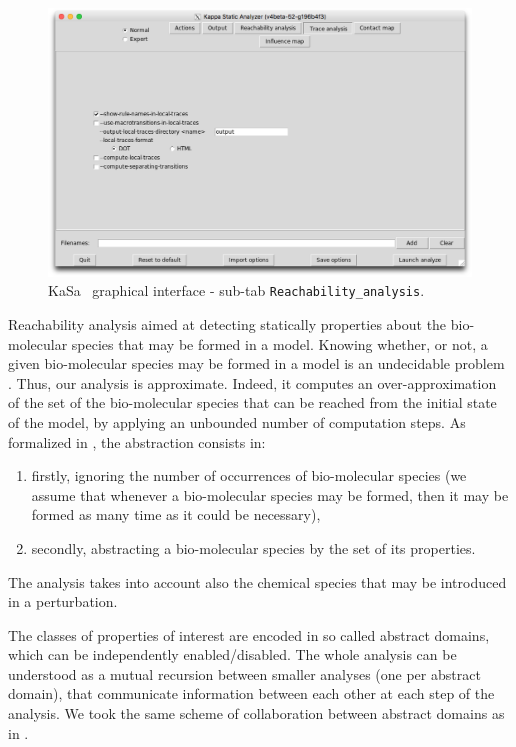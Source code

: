 \documentclass[11pt]{book}
\def\KaSa{\textsf{KaSa}}
\begin{document}
\begin{figure}[htbp]
\centering
\includegraphics[width=12cm]{img/kasa_3.png}
\caption{\KaSa~ graphical interface - sub-tab \texttt{Reachability\_analysis}.}
\label{fig:kasa:2}
\end{figure}

Reachability analysis aimed at detecting statically properties about the bio-molecular species that may be formed in a model.
Knowing whether, or not, a given bio-molecular species may be formed in a model is an undecidable problem \cite{Kreyssig}. Thus, our analysis is approximate. Indeed, it computes an over-approximation of the set of the bio-molecular species that can be reached from the initial state of the model, by applying an unbounded number of computation steps. As formalized in \cite{DanosEtAl-VMCAI08,Feret:SASB2016}, the abstraction consists in:
\begin{enumerate}
\item firstly, ignoring the number of occurrences of bio-molecular species (we assume that whenever a bio-molecular species may be formed, then it may be formed as many time as it could be necessary),
\item secondly, abstracting a bio-molecular species by the set of its properties.
\end{enumerate}
The analysis takes into account also the chemical species that may be introduced in a perturbation.

The classes of properties of interest are encoded in so called abstract domains, which can be independently enabled/disabled. The whole analysis can be understood as a mutual recursion between smaller analyses (one per abstract domain), that communicate information between each other at each step of the analysis. We took the same scheme of collaboration between abstract domains as in  \cite{CousotEtAl06-ASIAN}.
\end{document}
